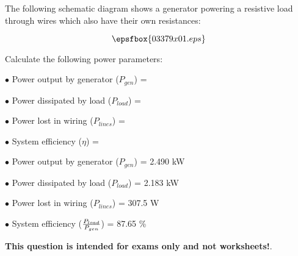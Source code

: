 

The following schematic diagram shows a generator powering a resistive load through wires which also have their own resistances:

$$\epsfbox{03379x01.eps}$$

Calculate the following power parameters:

\medskip
\item{$\bullet$} Power output by generator ($P_{gen}$) = 
\vskip 5pt
\item{$\bullet$} Power dissipated by load ($P_{load}$) =
\vskip 5pt
\item{$\bullet$} Power lost in wiring ($P_{lines}$) = 
\vskip 5pt
\item{$\bullet$} System efficiency ($\eta$) = 
\medskip







\medskip
\item{$\bullet$} Power output by generator ($P_{gen}$) = 2.490 kW
\item{$\bullet$} Power dissipated by load ($P_{load}$) = 2.183 kW
\item{$\bullet$} Power lost in wiring ($P_{lines}$) = 307.5 W
\item{$\bullet$} System efficiency ($P_{load} \over P_{gen}$) = 87.65 \%
\medskip







{\bf This question is intended for exams only and not worksheets!}.



